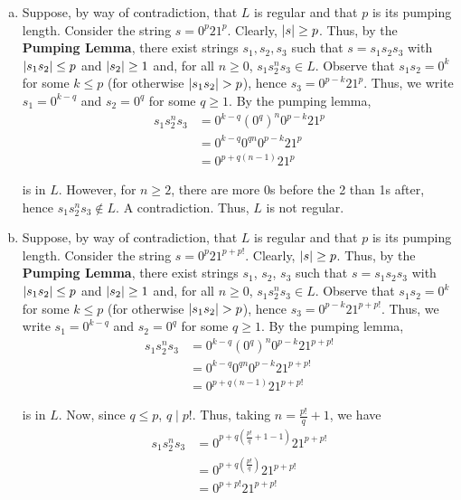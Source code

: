 \begin{solution}\mbox{\\}
\begin{enumerate}[(a)]
    \item Suppose, by way of contradiction, that \(L\) is regular and that \(p\) is its pumping length. Consider the string \(s=0^p21^p\). Clearly, \(\abs{s}\geq p\). Thus, by the \textbf{Pumping Lemma}, there exist strings \(s_1, s_2, s_3\) such that \(s=s_1s_2s_3\) with \(\abs{s_1 s_2}\leq p\) and \(\abs{s_2}\geq1\) and, for all \(n\geq 0\), \(s_1s_2^n s_3\in L\). Observe that \(s_1s_2=0^k\) for some \(k\leq p\) (for otherwise \(\abs{s_1s_2} > p\)), hence \(s_3=0^{p-k}21^p\). Thus, we write \(s_1=0^{k-q}\) and \(s_2=0^{q}\) for some \(q\geq1\). By the pumping lemma, 
    \begin{align*}
        s_1s_2^n s_3 &= 0^{k-q}{(0^q)}^n0^{p-k}21^p\\
                    &= 0^{k-q}0^{qn}0^{p-k}21^p\\
                    &= 0^{p+q(n-1)}21^p
    \end{align*}

    is in \(L\). However, for \(n\geq2\), there are more 0s before the 2 than 1s after, hence \(s_1s_2^n s_3\not\in L\). A contradiction. Thus, \(L\) is not regular.

    \item Suppose, by way of contradiction, that \(L\) is regular and that \(p\) is its pumping length. Consider the string \(s=0^p21^{p+p!}\). Clearly, \(\abs{s}\geq p\). Thus, by the \textbf{Pumping Lemma}, there exist strings \(s_1\), \(s_2\), \(s_3\) such that \(s=s_1s_2s_3\) with \(\abs{s_1s_2}\leq p\) and \(\abs{s_2}\geq1\) and, for all \(n\geq 0\), \(s_1s_2^n s_3\in L\). Observe that \(s_1s_2=0^k\) for some \(k\leq p\) (for otherwise \(\abs{s_1s_2} > p\)), hence \(s_3=0^{p-k}21^{p+p!}\). Thus, we write \(s_1=0^{k-q}\) and \(s_2=0^{q}\) for some \(q\geq1\). By the pumping lemma, 
    \begin{align*}
        s_1s_2^n s_3 &= 0^{k-q}{(0^q)}^n0^{p-k}21^{p+p!}\\
                    &= 0^{k-q}0^{qn}0^{p-k}21^{p+p!}\\
                    &= 0^{p+q(n-1)}21^{p+p!}
    \end{align*}

    is in \(L\). Now, since \(q\leq p\), \(q\mid p{!}\). Thus, taking \(n=\frac{p!}{q}+1\), we have 
    \begin{align*}
        s_1s_2^n s_3 &= 0^{p+q(\frac{p!}{q}+1-1)}21^{p+p!}\\
                    &= 0^{p+q(\frac{p!}{q})}21^{p+p!}\\
                    &= 0^{p+p!}21^{p+p!}
    \end{align*}
    

\end{enumerate}
\end{solution}
